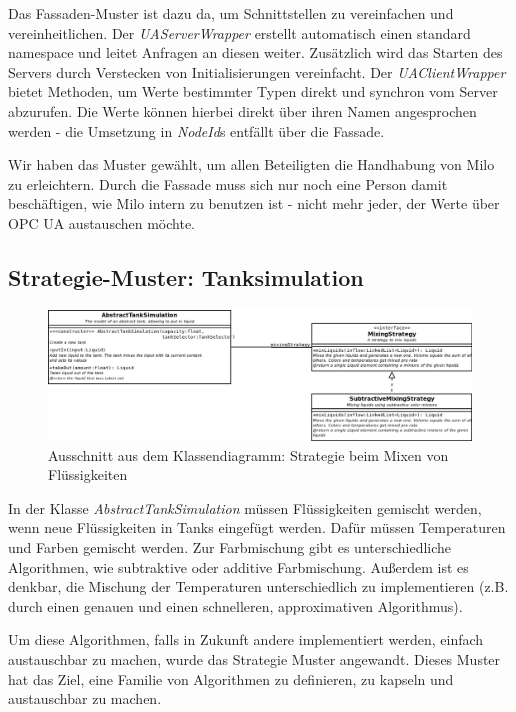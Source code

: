 \documentclass[parskip=full]{scrartcl}
\begin{document}
Das Fassaden-Muster ist dazu da, um Schnittstellen zu vereinfachen und vereinheitlichen.
Der \emph{UAServerWrapper} erstellt automatisch einen standard namespace und leitet Anfragen an
diesen weiter. Zusätzlich wird das Starten des Servers durch Verstecken von Initialisierungen vereinfacht. Der \emph{UAClientWrapper}
bietet Methoden, um Werte bestimmter Typen direkt und synchron vom Server abzurufen. Die Werte können hierbei direkt über ihren
Namen angesprochen werden - die Umsetzung in \emph{NodeId}s entfällt über die Fassade.

Wir haben das Muster gewählt, um allen
Beteiligten die Handhabung von Milo zu erleichtern. Durch die Fassade muss sich nur noch eine Person damit beschäftigen, wie
Milo intern zu benutzen ist - nicht mehr jeder, der Werte über OPC UA austauschen möchte.

\pagebreak
\subsection{Strategie-Muster: Tanksimulation}
\begin{figure}[H]
  \centering
  \includegraphics[scale=0.35]{design/pattern-screenshots/strategy-MixingStrategy.png}
  \caption{Ausschnitt aus dem Klassendiagramm: Strategie beim Mixen von Flüssigkeiten}
\end{figure}
In der Klasse \emph{AbstractTankSimulation} müssen Flüssigkeiten gemischt werden, wenn neue Flüssigkeiten in Tanks eingefügt werden.
Dafür müssen Temperaturen und Farben gemischt werden. Zur Farbmischung gibt es unterschiedliche Algorithmen, wie subtraktive oder additive
Farbmischung. Außerdem ist es denkbar, die Mischung der Temperaturen unterschiedlich zu implementieren (z.B. durch einen genauen und einen schnelleren,
approximativen Algorithmus).

Um diese Algorithmen, falls in Zukunft andere implementiert werden, einfach austauschbar zu machen, wurde
das Strategie Muster angewandt. Dieses Muster hat das Ziel, eine Familie von Algorithmen zu definieren, zu kapseln und austauschbar zu machen.
\end{document}
